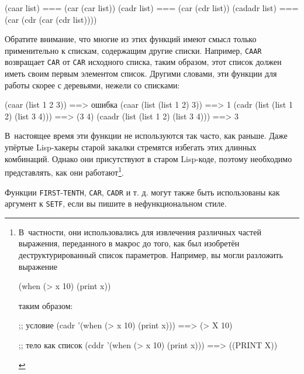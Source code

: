 \begin{myverb}
(caar list)   === (car (car list))
(cadr list)   === (car (cdr list))
(cadadr list) === (car (cdr (car (cdr list))))
\end{myverb}

Обратите внимание, что многие из этих функций имеют смысл только применительно к спискам,
содержащим другие списки. Например, \lstinline{CAAR} возвращает \lstinline{CAR} от \lstinline{CAR}
исходного списка, таким образом, этот список должен иметь своим первым элементом
список. Другими словами, эти функции для работы скорее с деревьями, нежели со списками:

\begin{myverb}
(caar (list 1 2 3))                  ==> ошибка
(caar (list (list 1 2) 3))           ==> 1
(cadr (list (list 1 2) (list 3 4)))  ==> (3 4)
(caadr (list (list 1 2) (list 3 4))) ==> 3
\end{myverb}

В~настоящее время эти функции не используются так часто, как раньше. Даже упёртые
Lisp-хакеры старой закалки стремятся избегать этих длинных комбинаций. Однако они
присутствуют в старом Lisp-коде, поэтому необходимо представлять, как они
работают\footnote{В~частности, они использовались для извлечения различных частей
  выражения, переданного в макрос до того, как был изобретён деструктурированный список
  параметров. Например, вы могли разложить выражение

\begin{myverb}
(when (> x 10) (print x))
\end{myverb}

\noindent{}таким образом:

\begin{myverb}
;; условие
(cadr '(when (> x 10) (print x))) ==> (> X 10)

;; тело как список
(cddr '(when (> x 10) (print x))) ==> ((PRINT X))
\end{myverb}
}.

Функции \lstinline{FIRST}-\lstinline{TENTH}, \lstinline{CAR}, \lstinline{CADR} и т. д. могут также быть
использованы как аргумент к \lstinline{SETF}, если вы пишите в нефункциональном стиле.

